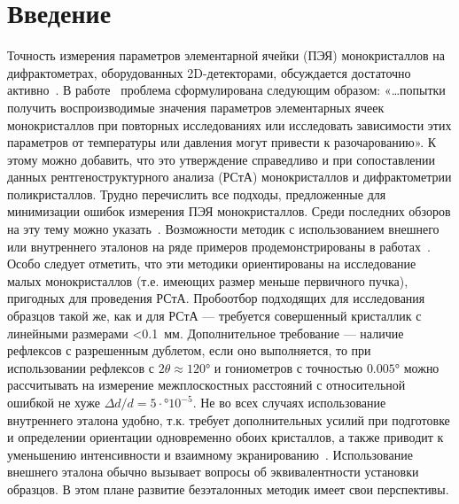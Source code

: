 \section{Введение}

Точность измерения параметров элементарной ячейки (ПЭЯ) монокристаллов на дифрактометрах, оборудованных 2D-детекторами, обсуждается достаточно активно~\cite{Herbstein:2000,Waterman:2010,Dudka:2010,Henn:2019,Taylor:1986,Serebrennikova:2021}.
В работе~\cite{Dudka:2017} проблема сформулирована следующим образом: «\ldots попытки получить воспроизводимые значения параметров элементарных ячеек монокристаллов при повторных исследованиях или исследовать зависимости этих параметров от температуры или давления могут привести к разочарованию».
К этому можно добавить, что это утверждение справедливо и при сопоставлении данных рентгеноструктурного анализа (РСтА) монокристаллов и дифрактометрии поликристаллов.
Трудно перечислить все подходы, предложенные для минимизации ошибок измерения ПЭЯ монокристаллов.
Среди последних обзоров на эту тему можно указать~\cite{Galdecka:2006,Lider:2020}.
Возможности методик с использованием внешнего или внутреннего эталонов на ряде примеров продемонстрированы в работах~\cite{Gromilov:2022,Panchenko:2022,Panchenko:2023,Serebrennikova:2023,Serebrennikova:2022}.
Особо следует отметить, что эти методики ориентированы на исследование малых монокристаллов (т.е. имеющих размер меньше первичного пучка), пригодных для проведения РСтА.
Пробоотбор подходящих для исследования образцов такой же, как и для РСтА — требуется совершенный кристаллик с линейными размерами <0.1~мм.
Дополнительное требование — наличие рефлексов с разрешенным дублетом, если оно выполняется, то при использовании рефлексов с $2θ \approx 120°$ и гониометров с точностью $0.005°$ можно рассчитывать на измерение межплоскостных расстояний с относительной ошибкой не хуже $Δ d / d = 5 ·° 10^{-5}$.
Не во всех случаях использование внутреннего эталона удобно, т.к. требует дополнительных усилий при подготовке и определении ориентации одновременно обоих кристаллов, а также приводит к уменьшению интенсивности и взаимному экранированию~\cite{Serebrennikova:2022}.
Использование внешнего эталона обычно вызывает вопросы об эквивалентности установки образцов.
В этом плане развитие безэталонных методик имеет свои перспективы.

